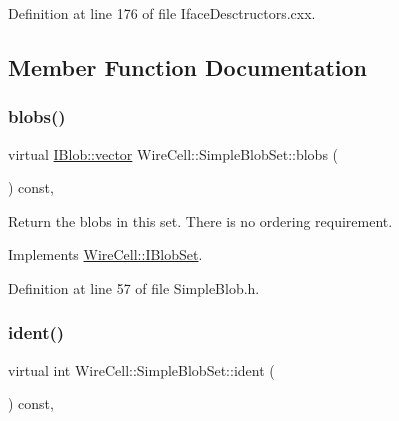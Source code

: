 Definition at line 176 of file Iface\+Desctructors.\+cxx.



\subsection{Member Function Documentation}
\mbox{\label{class_wire_cell_1_1_simple_blob_set_abee0b145a6a64ebc44fc37e05191188a}} 
\subsubsection{\texorpdfstring{blobs()}{blobs()}}
{\footnotesize\ttfamily virtual \hyperlink{class_wire_cell_1_1_i_data_ae1a9f863380499bb43f39fabb6276660}{I\+Blob\+::vector} Wire\+Cell\+::\+Simple\+Blob\+Set\+::blobs (\begin{DoxyParamCaption}{ }\end{DoxyParamCaption}) const\hspace{0.3cm}{\ttfamily [inline]}, {\ttfamily [virtual]}}

Return the blobs in this set. There is no ordering requirement. 

Implements \hyperlink{class_wire_cell_1_1_i_blob_set_af9c19bbf4c1241ddaa3b2022129a766a}{Wire\+Cell\+::\+I\+Blob\+Set}.



Definition at line 57 of file Simple\+Blob.\+h.

\mbox{\label{class_wire_cell_1_1_simple_blob_set_ad3ac749afa97671793e1c16e390c3534}} 
\subsubsection{\texorpdfstring{ident()}{ident()}}
{\footnotesize\ttfamily virtual int Wire\+Cell\+::\+Simple\+Blob\+Set\+::ident (\begin{DoxyParamCaption}{ }\end{DoxyParamCaption}) const\hspace{0.3cm}{\ttfamily [inline]}, {\ttfamily [virtual]}}



